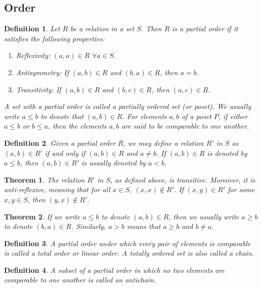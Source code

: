 \documentclass[a4paper]{article}
\newtheorem{mytheorem}{Theorem}
\newtheorem{mydef}{Definition}
\numberwithin{mytheorem}{section}
\numberwithin{mydef}{section}
\numberwithin{axiom}{section}
\numberwithin{example}{section}
\begin{document}
\subsection{Order}

\begin{mydef}Let $R$ be a relation in a set $S$. Then $R$ is a partial order if it satisfies the following properties:
 \begin{enumerate}
 \item Reflexivity: $(a,a) \in R$ $\forall a \in S$. 
 \item Antisymmetry: If $(a,b) \in R$ and $(b,a) \in R$, then $a = b$. 
 \item Transitivity: If $(a,b) \in R$ and $(b,c) \in R$, then $(a,c) \in R$.
 \end{enumerate}
 A set with a partial order is called a partially ordered set (or poset). We usually write $a \leq b$ to denote that $(a,b) \in R$. For elements $a,b$ of a poset $P$, if either $a \leq b$ or $b \leq a$, then the elements $a,b$ are said to be comparable to one another. 
\end{mydef}

\begin{mydef} Given a partial order $R$, we may define a relation $R'$ in $S$ as $(a,b) \in R'$ if and only if $(a,b) \in R$ and $a \neq b$. If $(a,b) \in R$ is denoted by $a \leq b$, then $(a,b) \in R'$ is usually denoted by $a < b$. 
\end{mydef}

\begin{mytheorem} The relation $R'$ in $S$, as defined above, is transitive. Moreover, it is anti-reflexive, meaning that for all $x \in S$, $(x,x) \notin R'$. If $(x,y) \in R'$ for some $x,y \in S$, then $(y,x) \notin R'$. 
\end{mytheorem}

\begin{mytheorem} If we write $a \leq b$ to denote $(a,b) \in R$, then we usually write $a \geq b$ to denote $(b,a) \in R$. Similarly, $a > b$ means that $a \geq b$ and $b \neq a$. 
\end{mytheorem}


\begin{mydef} A partial order under which every pair of elements is comparable is called a total order or linear order. A totally ordered set is also called a chain. 
\end{mydef}

\begin{mydef} A subset of a partial order in which no two elements are comparable to one another is called an antichain.
\end{mydef}
\end{document}
